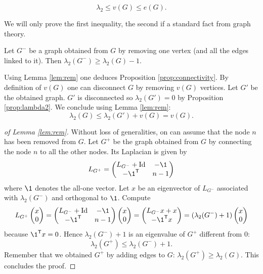 \documentclass[11pt,nocut]{article}
\begin{document}
\begin{proposition}\label{prop:connectivity}
	$$
	\lambda_2 \leq v(G) \leq e(G).
	$$
\end{proposition}
We will only prove the first inequality, the second if a standard fact from graph theory.
\begin{lemma}\label{lem:rem}
	Let $G^{-}$ be a graph obtained from $G$ by removing one vertex (and all the edges linked to it). Then $\lambda_2(G^{-}) \geq \lambda_2(G) - 1$.
\end{lemma}
Using Lemma \ref{lem:rem} one deduces Proposition \ref{prop:connectivity}. By definition of $v(G)$ one can disconnect $G$ by removing $v(G)$ vertices. Let $G'$ be the obtained graph. $G'$ is disconnected so $\lambda_2(G') = 0$ by Proposition \ref{prop:lambda2}. We conclude using Lemma \ref{lem:rem}:
$$
\lambda_2(G) \leq \lambda_2(G') + v(G) = v(G).
$$
\begin{proof}[of Lemma \ref{lem:rem}]
	Without loss of generalities, on can assume that the node $n$ has been removed from $G$.
	Let $G^+$ be the graph obtained from $G$ by connecting the node $n$ to all the other nodes. Its Laplacian is given by
	$$
	L_{G^+} =
	\begin{pmatrix}
		L_{G^-} + \Id & -\1 \\
		-\1^{\sT} & n-1
	\end{pmatrix}
	$$
	where $\1$ denotes the all-one vector.
	Let $x$ be an eigenvector of $L_{G^-}$ associated with $\lambda_2(G^{-})$ and orthogonal to $\1$. Compute
	$$
	L_{G^+} 
	\begin{pmatrix}
		x\\
		0
	\end{pmatrix}
	=
	\begin{pmatrix}
		L_{G^-} + \Id & -\1 \\
		-\1^{\sT} & n-1
	\end{pmatrix}
	\begin{pmatrix}
		x\\
		0
	\end{pmatrix}
	=
	\begin{pmatrix}
		L_{G^-} x + x \\
		-\1^{\sT}x 
	\end{pmatrix}
	=
(\lambda_2(G^{-}) + 1)
	\begin{pmatrix}
		 x \\
		0
	\end{pmatrix}
	$$
	because $\1^{\sT}x=0$. Hence $\lambda_2(G^{-}) + 1$ is an eigenvalue of $G^+$ different from $0$:
	$$
	\lambda_2(G^+) \leq \lambda_2(G^{-}) + 1.
	$$
Remember that we obtained $G^+$ by adding edges to $G$: $\lambda_2(G^+) \geq \lambda_2(G)$. This concludes the proof. 
\end{proof}
\end{document}
